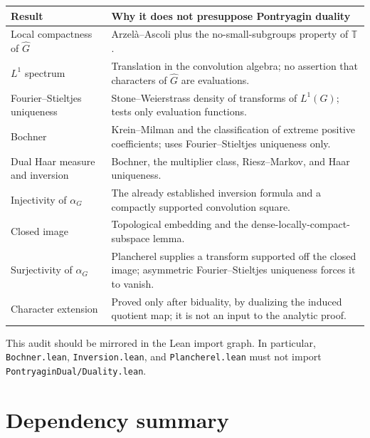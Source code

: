 \documentclass[11pt]{article}
\theoremstyle{definition}
\theoremstyle{remark}
\newcommand{\T}{\mathbb T}
\newcommand{\Lp}[1]{L^{#1}}
\newcommand{\dual}[1]{\widehat{#1}}
\begin{document}
\begin{longtable}{>{\raggedright\arraybackslash}p{}
                  >{\raggedright\arraybackslash}p{}}
\toprule
Result & Why it does not presuppose Pontryagin duality \\
\midrule
\endhead
Local compactness of $\dual G$ & Arzel\`a--Ascoli plus the no-small-subgroups property of
$\T$. \\
$\Lp1$ spectrum & Translation in the convolution algebra; no assertion that characters
of $\dual G$ are evaluations. \\
Fourier--Stieltjes uniqueness & Stone--Weierstrass density of transforms of
$\Lp1(G)$; tests only evaluation functions. \\
Bochner & Krein--Milman and the classification of extreme positive coefficients; uses
Fourier--Stieltjes uniqueness only. \\
Dual Haar measure and inversion & Bochner, the multiplier class, Riesz--Markov, and Haar
uniqueness. \\
Injectivity of $\alpha_G$ & The already established inversion formula and a compactly
supported convolution square. \\
Closed image & Topological embedding and the dense-locally-compact-subspace lemma. \\
Surjectivity of $\alpha_G$ & Plancherel supplies a transform supported off the closed
image; asymmetric Fourier--Stieltjes uniqueness forces it to vanish. \\
Character extension & Proved only after biduality, by dualizing the induced quotient map;
it is not an input to the analytic proof. \\
\bottomrule
\end{longtable}

This audit should be mirrored in the Lean import graph.  In particular,
\texttt{Bochner.lean}, \texttt{Inversion.lean}, and \texttt{Plancherel.lean} must not
import \texttt{PontryaginDual/Duality.lean}.

\section{Dependency summary}
\label{sec:dependency-summary}
\end{document}
